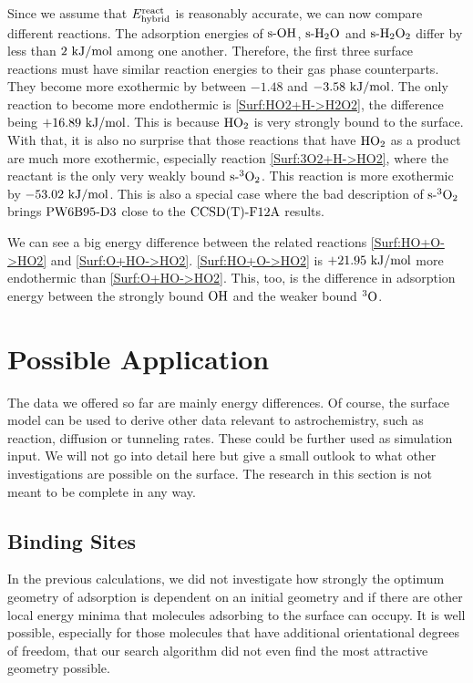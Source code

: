 \documentclass[8.5pt,twoside,twocolumn]{article}
\newcommand\sur{\enmat{\te{s-}}}
\newcommand\tripo{\enmat{{^3\te{O}}}}
\newcommand\tripot{\enmat{{^3\ot}}}
\newcommand\kmo{\enmat{\te {kJ/mol}}}
\theoremstyle{standard}
\begin{document}
Since we assume that $E^{\text{react}}_{\text{hybrid}}$ is reasonably accurate, we can now compare
different reactions. The adsorption energies of $\sur\ho$, $\sur\hto$ and
$\sur\htot$ differ by less than $2~\kmo$ among one another. Therefore,
the first three surface reactions must have similar reaction energies
to their gas phase counterparts. They become more exothermic by between
$-1.48$ and $-3.58~\kmo$. The only reaction to become more endothermic
is \eqref{Surf:HO2+H->H2O2}, the difference being $+16.89~\kmo$. This
is because $\text H \text O_2$ is very strongly
bound to the surface. With that, it is also no surprise that those
reactions that have $\text H \text O_2$ as a product are much more exothermic, especially
reaction \eqref{Surf:3O2+H->HO2}, where the reactant is the only
very weakly bound $\sur\tripot$. This reaction is more exothermic
by $-53.02~\kmo$. This is also a special case where the bad description
of $\sur\tripot$ brings $\text{PW6B95}\text{-D3}$ close to the $\text{CCSD(T)-F12A}$ results.

We can see a big energy difference between the related reactions
\eqref{Surf:HO+O->HO2} and \eqref{Surf:O+HO->HO2}. \eqref{Surf:HO+O->HO2}
is $+21.95~\kmo$ more endothermic than \eqref{Surf:O+HO->HO2}. This, too,
is the difference in adsorption energy between the strongly bound $\text O \text H$
and the weaker bound $\tripo$.

\section{Possible Application}

The data we offered so far are mainly energy differences. Of course, the
surface model can be used to derive other data relevant to astrochemistry,
such as reaction, diffusion or tunneling rates. These could be further used
as simulation input. We will not go into detail here but give a small
outlook to what other investigations are possible on the surface. The research
in this section is not meant to be complete in any way.

\subsection{Binding Sites}
\newcommand\rmax{\enmat{r_{\te{max}}}}
\newcommand\rmin{\enmat{r_{\te{min}}}}
\label{Sec:Adv:Binding}


In the previous calculations, we did not investigate how strongly the optimum
geometry of adsorption is dependent on an initial geometry and if there
are other local energy minima that molecules adsorbing to the surface can occupy.
It is well possible, especially for those molecules that have additional orientational
degrees of freedom, that our search algorithm did not even find the most attractive
geometry possible.
\end{document}
